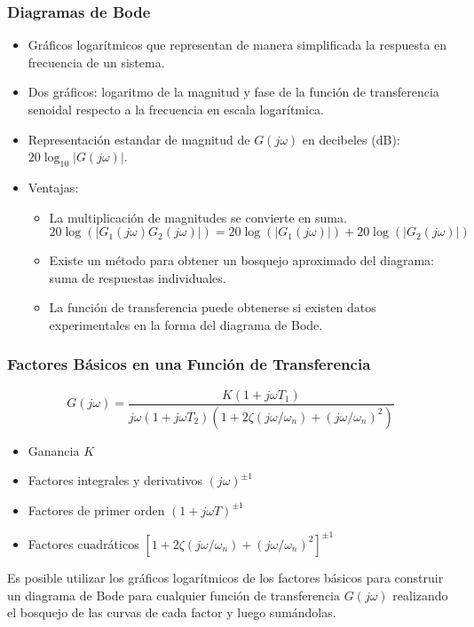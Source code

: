 \documentclass[aspectratio=169, handout]{beamer}
\theoremstyle{definition}
\theoremstyle{plain}
\theoremstyle{remark}
\begin{document}
\begin{frame}[<+->]\frametitle{Diagramas de Bode}
	\begin{itemize}
		\item Gráficos logarítmicos que representan de manera simplificada la respuesta en frecuencia de un sistema.
		\item Dos gráficos: logaritmo de la magnitud y fase de la función de transferencia senoidal respecto a la frecuencia en escala logarítmica.
		\item Representación estandar de magnitud de $G(j\omega)$ en decibeles (dB): $20 \log_{10}|G(j\omega)|$.
		\item Ventajas:
		\begin{itemize}
			\item La multiplicación de magnitudes se convierte en suma.
			\begin{equation*}
				20 \log (|G_1(j\omega)G_2(j\omega)|) = 20 \log (|G_1(j\omega)|) + 20 \log (|G_2(j\omega)|)
			\end{equation*}
			\item Existe un método para obtener un bosquejo aproximado del diagrama: suma de respuestas individuales.
			\item La función de transferencia puede obtenerse si existen datos experimentales en la forma del diagrama de Bode.
		\end{itemize}
	\end{itemize}
\end{frame}

\begin{frame}[<+->]\frametitle{Factores Básicos en una Función de Transferencia}
	\begin{equation*}
		G(j\omega) = \frac{K(1+j\omega T_1)}{j\omega(1 + j\omega T_2)(1 + 2\zeta(j\omega/\omega_n)+(j\omega/\omega_n)^2)}
	\end{equation*}
	\pause
	\begin{itemize}
		\item Ganancia $K$
		\item Factores integrales y derivativos $(j\omega)^{\pm 1}$
		\item Factores de primer orden $(1 + j\omega T)^{\pm 1}$
		\item Factores cuadráticos $[1 + 2\zeta(j\omega/\omega_n)+(j\omega/\omega_n)^2]^{\pm 1}$
	\end{itemize}
	\pause
	Es posible utilizar los gráficos logarítmicos de los factores básicos para construir un diagrama de Bode para cualquier función de transferencia $G(j\omega)$ realizando el bosquejo de las curvas de cada factor y luego sumándolas.
\end{frame}
\end{document}
